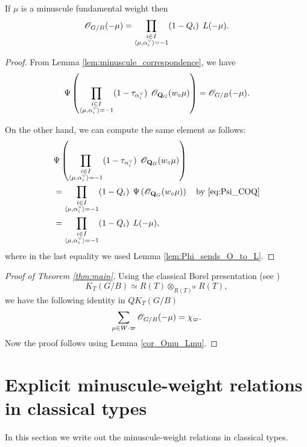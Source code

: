 \documentclass{amsart}
\numberwithin{equation}{section}
\begin{document}
\begin{lem}\label{cor_Omu_Lmu}
    If $\mu$ is a minuscule fundamental weight then $$\mathscr{O}_{G/B}(-\mu)=\prod_{\substack{i\in I\\
        \langle\mu,\alpha_i^\lor\rangle={-}1}}
        (1-Q_i)
\;\,    {L}(-\mu).$$
\end{lem}
\begin{proof}
    From Lemma \ref{lem:minuscule_correspondence}, we have 
\begin{align*}
\Psi\left(\prod_{\substack{i \in I \\ \langle \mu, \alpha_{i}^{\vee} \rangle = -1}} (1-\tau_{\alpha_i^\lor})
\;\,\mathscr{O}_{\mathbf{Q}_G}(w_\circ \mu)\right) 
=\mathscr{O}_{G/B}({-}\mu).
\end{align*}


On the other hand, we can compute the same element as follows: 
\begin{align*}
&\Psi\left(
\prod_{\substack{i \in I \\ \langle \mu, \alpha_{i}^{\vee} \rangle = -1}} (1-\tau_{\alpha_i^\lor})
\;\,\mathscr{O}_{\mathbf{Q}_G}(w_\circ \mu)\right) \\
&=   
\prod_{\substack{i \in I \\ \langle \mu, \alpha_{i}^{\vee} \rangle = -1}} (1-Q_i)
\;\,\Psi\left(\mathscr{O}_{\mathbf{Q}_G}(w_\circ \mu)\right)
\quad \text{by \eqref{eq:Psi_COQ}}\\
&=\prod_{\substack{i \in I \\ \langle \mu, \alpha_{i}^{\vee} \rangle = -1}} (1-Q_i)
\;\,{L}(-\mu),
\end{align*}
where in the last equality we used 
Lemma \ref{lem:Phi_sends_O_to_L}.
\end{proof}


\begin{proof}
[Proof of Theorem \ref{thm:main}]
Using the classical Borel presentation (see \cite{Mc})
\begin{equation}
    K_{T}(G/B) \simeq R(T) \otimes_{R(T)^{W}} R(T),
\end{equation}
we have the following identity in $QK_T(G/B)$
$$\sum_{\mu\in W\cdot\varpi}\mathscr{O}_{G/B}(-\mu) = \chi_\varpi.$$ 
    Now the proof follows using Lemma \ref{cor_Omu_Lmu}.
\end{proof}





\section{Explicit minuscule-weight relations in classical types}\label{sec:example}
 In this section we write out the minuscule-weight relations in classical types. 
\end{document}
